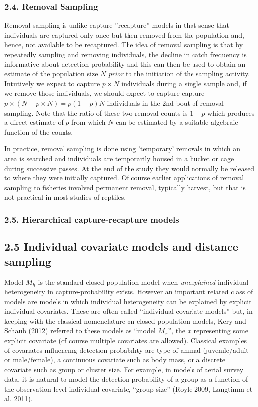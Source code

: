 \documentclass{book}
\begin{document}
\subsubsection*{2.4. Removal Sampling}

Removal sampling is unlike capture-''recapture'' models in that sense
that individuals are captured only once but then removed from the
population and, hence, not available to be recaptured. The idea of
removal sampling is that by repeatedly sampling and removing
individuals, the decline in catch frequency is informative about
detection probability and this can then be used to obtain an estimate
of the population size $N$ {\it prior} to the initiation of the
sampling activity. Intutively we expect to capture $p \times N$
individuals during a single sample and, if we remove those
individuals, we should expect to capture capture $p \times (N - p
\times N) = p(1-p) N$ individuals in the 2nd bout of removal
sampling. Note that the ratio of these two removal counts is $1-p$
which produces a direct estimate of $p$ from which $N$ can be
estimated by a suitable algebraic function of the counts.

In practice, removal sampling is done using 'temporary' removals in
which an area is searched and individuals are temporarily housed in a
bucket or cage during successive passes. At the end of the study they
would normally be released to where they were initially captured. Of
course earlier applications of removal sampling to fisheries involved
permanent removal, typically harvest, but that is not practical in 
most studies of reptiles. 


\subsubsection*{2.5. Hierarchical capture-recapture models}


\subsection*{2.5 Individual covariate models and distance sampling}

Model $M_h$ is the standard closed population model when {\it
  unexplained} individual heterogeneity in capture-probability
exists. However an important related class of models are models in
which individual heterogeneity can be explained by explicit individual
covariates. These are often called ``individual covariate models''
but, in keeping with the classical nomenclature on closed population
models, Kery and Schaub (2012) referred to these models as ``model
$M_{x}$'', the $x$ representing some explicit covariate (of course
multiple covariates are allowed).  Classical examples of covariates
influencing detection probability are type of animal (juvenile/adult
or male/female), a continuous covariate such as body mass, or a
discrete covariate such as group or cluster size. For example, in
models of aerial survey data, it is natural to model the detection
probability of a group as a function of the observation-level
individual covariate, ``group size'' (Royle 2009, Langtimm et
al. 2011).
\end{document}

